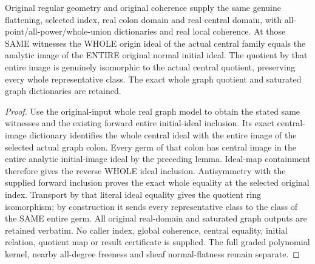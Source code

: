 \begin{theorem}
\label{hir:real-domain-original-whole-central-initial-ideal-equality}
\leanok
Original regular geometry and original coherence supply the same genuine
flattening, selected index, real colon domain and real central domain, with
all-point/all-power/whole-union dictionaries and real local coherence. At
those SAME witnesses the WHOLE origin ideal of the actual central family
equals the analytic image of the ENTIRE original normal initial ideal.
The quotient by that entire image is genuinely isomorphic to the actual
central quotient, preserving every whole representative class. The exact
whole graph quotient and saturated graph dictionaries are retained.
\end{theorem}
\begin{proof}
Use the original-input whole real graph model to obtain the stated same
witnesses and the existing forward entire initial-ideal inclusion. Its exact
central-image dictionary identifies the whole central ideal with the entire
image of the selected actual graph colon. Every germ of that colon has
central image in the entire analytic initial-image ideal by the preceding
lemma. Ideal-map containment therefore gives the reverse WHOLE ideal
inclusion. Antisymmetry with the supplied forward inclusion proves the exact
whole equality at the selected original index. Transport by that literal
ideal equality gives the quotient ring isomorphism; by construction it sends
every representative class to the class of the SAME entire germ. All
original real-domain and saturated graph outputs are retained verbatim.
No caller index, global coherence, central equality, initial relation,
quotient map or result certificate is supplied. The full graded polynomial
kernel, nearby all-degree freeness and sheaf normal-flatness remain separate.
\end{proof}
